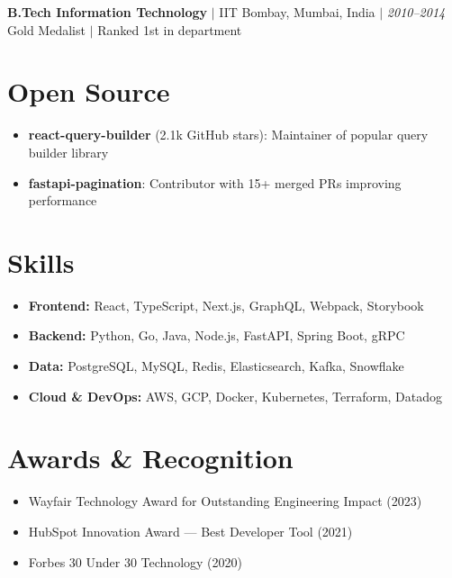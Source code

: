\documentclass[10pt,a4paper]{article}
\begin{document}
\textbf{B.Tech Information Technology} $|$ IIT Bombay, Mumbai, India $|$ \textit{2010--2014} \\
Gold Medalist $|$ Ranked 1st in department

\section{Open Source}

\begin{itemize}
  \item \textbf{react-query-builder} (2.1k GitHub stars): Maintainer of popular query builder library
  \item \textbf{fastapi-pagination}: Contributor with 15+ merged PRs improving performance
\end{itemize}

\section{Skills}

\begin{itemize}
  \item \textbf{Frontend:} React, TypeScript, Next.js, GraphQL, Webpack, Storybook
  \item \textbf{Backend:} Python, Go, Java, Node.js, FastAPI, Spring Boot, gRPC
  \item \textbf{Data:} PostgreSQL, MySQL, Redis, Elasticsearch, Kafka, Snowflake
  \item \textbf{Cloud \& DevOps:} AWS, GCP, Docker, Kubernetes, Terraform, Datadog
\end{itemize}

\section{Awards \& Recognition}

\begin{itemize}
  \item Wayfair Technology Award for Outstanding Engineering Impact (2023)
  \item HubSpot Innovation Award --- Best Developer Tool (2021)
  \item Forbes 30 Under 30 Technology (2020)
\end{itemize}
\end{document}
